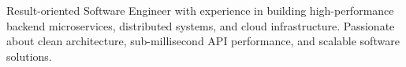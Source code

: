 Result-oriented Software Engineer with experience in building high-performance backend microservices, distributed systems, and cloud infrastructure. Passionate about clean architecture, sub-millisecond API performance, and scalable software solutions.
